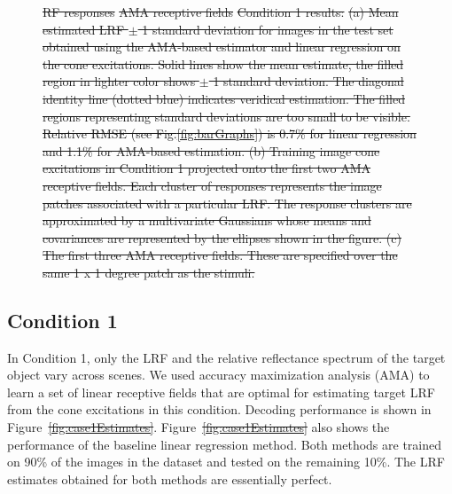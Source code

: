 \documentclass{jov}
\providecommand{\DIFaddtex}[1]{{\protect\color{blue}\uwave{#1}}} %
\providecommand{\DIFdeltex}[1]{{\protect\color{red}\sout{#1}}}                      %
\providecommand{\DIFaddbegin}{} %
\providecommand{\DIFaddend}{} %
\providecommand{\DIFdelbegin}{} %
\providecommand{\DIFdelend}{} %
\providecommand{\DIFdelFL}[1]{\DIFdel{#1}} %
\providecommand{\DIFdelendFL}{} %
\providecommand{\DIFadd}[1]{\texorpdfstring{\DIFaddtex{#1}}{#1}} %
\providecommand{\DIFdel}[1]{\texorpdfstring{\DIFdeltex{#1}}{}} %
\newcommand{\DIFscaledelfig}{0.5}
\newlength{\DIFdelgraphicswidth} %
\newlength{\DIFdelgraphicsheight} %
\newcommand{\DIFaddincludegraphics}[2][]{{\color{blue}\fbox{\DIFOincludegraphics[#1]{#2}}}} %
\newcommand{\DIFdelincludegraphics}[2][]{%
\sbox{\DIFdelgraphicsbox}{\DIFOincludegraphics[#1]{#2}}%
\settoboxwidth{\DIFdelgraphicswidth}{\DIFdelgraphicsbox} %
\settoboxtotalheight{\DIFdelgraphicsheight}{\DIFdelgraphicsbox} %
\scalebox{\DIFscaledelfig}{%
\parbox[b]{\DIFdelgraphicswidth}{\usebox{\DIFdelgraphicsbox}\\[-\baselineskip] \rule{\DIFdelgraphicswidth}{0em}}\llap{\resizebox{\DIFdelgraphicswidth}{\DIFdelgraphicsheight}{%
\setlength{\unitlength}{\DIFdelgraphicswidth}%
\begin{picture}(1,1)%
\thicklines\linethickness{2pt} %
{\color[rgb]{1,0,0}\put(0,0){\framebox(1,1){}}}%
{\color[rgb]{1,0,0}\put(0,0){\line( 1,1){1}}}%
{\color[rgb]{1,0,0}\put(0,1){\line(1,-1){1}}}%
\end{picture}%
}\hspace*{3pt}}} %
} %
\DeclareRobustCommand{\DIFaddbegin}{\DIFOaddbegin \let\includegraphics\DIFaddincludegraphics} %
\DeclareRobustCommand{\DIFaddend}{\DIFOaddend \let\includegraphics\DIFOincludegraphics} %
\DeclareRobustCommand{\DIFdelbegin}{\DIFOdelbegin \let\includegraphics\DIFdelincludegraphics} %
\DeclareRobustCommand{\DIFdelend}{\DIFOaddend \let\includegraphics\DIFOincludegraphics} %
\DeclareRobustCommand{\DIFdelendFL}{\DIFOaddendFL \let\includegraphics\DIFOincludegraphics} %
\begin{document}
\begin{figure}
{%
\DIFdelFL{RF responses}}
{%
\DIFdelFL{AMA receptive fields}}
{%
\DIFdelFL{Condition 1 results:}%
\DIFdelFL{(a) Mean estimated LRF $\pm$ 1 standard deviation for images in the test set obtained using the AMA-based estimator and linear regression on the cone excitations. Solid lines show the mean estimate, the filled region in lighter color shows $\pm$ 1 standard deviation. The diagonal identity line (dotted blue) indicates veridical estimation. The filled regions representing standard deviations are too small to be visible. Relative RMSE (see Fig.\ref{fig:barGraphs}) is 0.7\% for linear regression and 1.1\%  for AMA-based estimation. (b) Training image cone excitations in Condition 1 projected onto the first two AMA receptive fields. Each cluster of responses represents the image patches associated with a particular LRF. The response clusters are approximated by a multivariate Gaussians whose means and covariances are represented by the ellipses shown in the figure. (c) The first three AMA receptive fields. These are specified over the same 1 x 1 degree patch as the stimuli.}}
\DIFdelendFL \label{fig:Condition1}
\end{figure}

\subsection{Condition 1}
In Condition 1, only the LRF and the relative reflectance spectrum of the target object vary across scenes.
We used accuracy maximization analysis (AMA) to learn a set of linear receptive fields that are optimal for estimating target LRF from the cone excitations in this condition. 
Decoding performance is shown in Figure~\DIFdelbegin \DIFdel{\ref{fig:case1Estimates}}\DIFdelend \DIFaddbegin \DIFadd{\ref{fig:Condition1}a}\DIFaddend . 
Figure~\DIFdelbegin \DIFdel{\ref{fig:case1Estimates} }\DIFdelend \DIFaddbegin \DIFadd{\ref{fig:Condition1}a }\DIFaddend also shows the performance of the baseline linear regression method. 
Both methods are trained on 90\% of the images in the dataset and tested on the remaining 10\%.
The LRF estimates obtained for both methods are essentially perfect.
\end{document}
